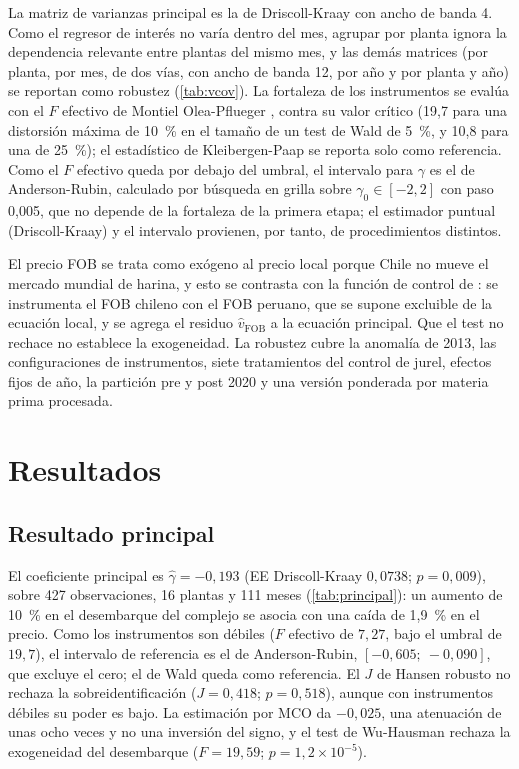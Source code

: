 \documentclass[11pt]{article}
\begin{document}
La matriz de varianzas principal es la de Driscoll-Kraay \parencite{driscoll1998} con ancho de banda 4. Como el regresor de interés no varía dentro del mes, agrupar por planta ignora la dependencia relevante entre plantas del mismo mes, y las demás matrices (por planta, por mes, de dos vías, con ancho de banda 12, por año y por planta y año) se reportan como robustez (\autoref{tab:vcov}). La fortaleza de los instrumentos se evalúa con el $F$ efectivo de Montiel Olea-Pflueger \parencite{olea2013robust}, contra su valor crítico (19,7 para una distorsión máxima de 10~\% en el tamaño de un test de Wald de 5~\%, y 10,8 para una de 25~\%); el estadístico de Kleibergen-Paap se reporta solo como referencia. Como el $F$ efectivo queda por debajo del umbral, el intervalo para $\gamma$ es el de Anderson-Rubin, calculado por búsqueda en grilla sobre $\gamma_0\in[-2,2]$ con paso 0,005, que no depende de la fortaleza de la primera etapa; el estimador puntual (Driscoll-Kraay) y el intervalo provienen, por tanto, de procedimientos distintos.

El precio FOB se trata como exógeno al precio local porque Chile no mueve el mercado mundial de harina, y esto se contrasta con la función de control de \textcite{riversvuong1988}: se instrumenta el FOB chileno con el FOB peruano, que se supone excluible de la ecuación local, y se agrega el residuo $\hat v_{\text{FOB}}$ a la ecuación principal. Que el test no rechace no establece la exogeneidad. La robustez cubre la anomalía de 2013, las configuraciones de instrumentos, siete tratamientos del control de jurel, efectos fijos de año, la partición pre y post 2020 y una versión ponderada por materia prima procesada.
\section{Resultados}\label{sec:results}

\subsection{Resultado principal}\label{sec:principal}

El coeficiente principal es $\hat\gamma=-0{,}193$ (EE Driscoll-Kraay $0{,}0738$; $p=0{,}009$), sobre 427 observaciones, 16 plantas y 111 meses (\autoref{tab:principal}): un aumento de 10~\% en el desembarque del complejo se asocia con una caída de 1,9~\% en el precio. Como los instrumentos son débiles ($F$ efectivo de $7{,}27$, bajo el umbral de $19{,}7$), el intervalo de referencia es el de Anderson-Rubin, $[-0{,}605;\ -0{,}090]$, que excluye el cero; el de Wald queda como referencia. El $J$ de Hansen robusto no rechaza la sobreidentificación ($J=0{,}418$; $p=0{,}518$), aunque con instrumentos débiles su poder es bajo. La estimación por MCO da $-0{,}025$, una atenuación de unas ocho veces y no una inversión del signo, y el test de Wu-Hausman rechaza la exogeneidad del desembarque ($F=19{,}59$; $p=1{,}2\times10^{-5}$).
\end{document}
